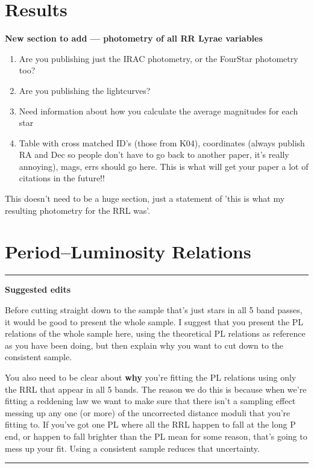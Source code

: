 \documentclass[a4paper,fleqn,usenatbib]{mnras}
\begin{document}
\section{Results}
\label{sec:results}
{\bf New section to add --- photometry of all RR Lyrae variables} 
\begin{enumerate}
\item Are you publishing just the IRAC photometry, or the FourStar photometry too?
\item Are you publishing the lightcurves?
\item Need information about how you calculate the average magnitudes for each star
\item Table with cross matched ID's (those from K04), coordinates (always publish RA and Dec so people don't have to go back to another paper, it's really annoying), mags, errs should go here. This is what will get your paper a lot of citations in the future!!
\end{enumerate}

This doesn't need to be a huge section, just a statement of 'this is what my resulting photometry for the RRL was'.

\section{Period--Luminosity Relations}
\label{sec:pl_relation}
\noindent\rule[0.5ex]{\linewidth}{1pt}

{\bf Suggested edits}

Before cutting straight down to the sample that's just stars in all 5 band passes, it would be good to present the whole sample. I suggest that you present the PL relations of the whole sample here, using the theoretical PL relations as reference as you have been doing, but then explain why you want to cut down to the consistent sample.

You also need to be clear about {\bf why} you're fitting the PL relations using only the RRL that appear in all 5 bands. The reason we do this is because when we're fitting a reddening law we want to make sure that there isn't a sampling effect messing up any one (or more) of the uncorrected distance moduli that you're fitting to. If you've got one PL where all the RRL happen to fall at the long P end, or happen to fall brighter than the PL mean for some reason, that's going to mess up your fit. Using a consistent sample reduces that uncertainty. 

\noindent\rule[0.5ex]{\linewidth}{1pt}
\end{document}
